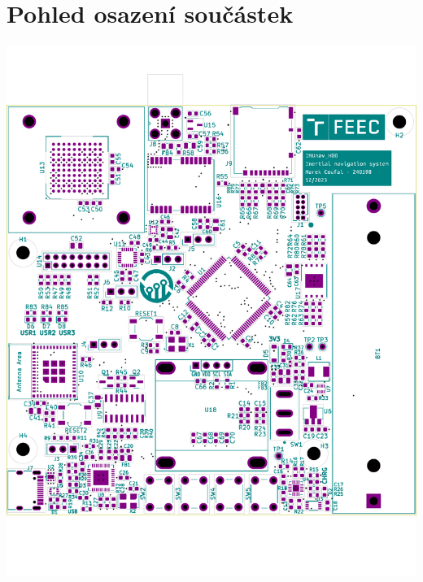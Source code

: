 \section{Pohled osazení součástek} \label{placementApp}
\includegraphics[width=\textwidth]{KiCad/boardTopParts}

